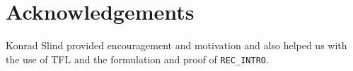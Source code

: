 \documentclass{llncs}
\begin{document}
\section{Acknowledgements}
\label{secAcknowledgements}

\vspace*{-1mm}

Konrad Slind provided encouragement and motivation and also helped us
with the use of TFL and the formulation and proof of \texttt{REC\_INTRO}.

\vspace*{-1mm}



\end{document}
